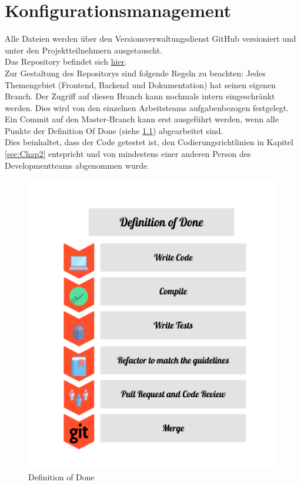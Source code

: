 
\chapter{Konfigurationsmanagement}
Alle Dateien werden über den Versionsverwaltungsdienst GitHub versioniert und unter den Projektteilnehmern ausgetauscht.\\
Das Repository befindet sich \href{https://github.com/LucRome/SWE_Semester4}{hier}.\\

Zur Gestaltung des Repositorys sind folgende Regeln zu beachten:
Jedes Themengebiet (Frontend, Backend und Dokumentation) hat seinen eigenen Branch.
Der Zugriff auf diesen Branch kann nochmals intern eingeschränkt werden. Dies wird von den einzelnen Arbeitsteams aufgabenbezogen festgelegt. \\
Ein Commit auf den Master-Branch kann erst ausgeführt werden, wenn alle Punkte der Definition Of Done (siehe \ref{fib:DOD}) abgearbeitet sind. \\
Dies beinhaltet, dass der Code getestet ist, den Codierungsrichtlinien in Kapitel \ref{sec:Chap2} entspricht und von mindestens einer anderen Person des Developmentteams abgenommen wurde. \\

\begin{figure}[H]
\centering
\includegraphics[height=.8\textwidth]{definition_of_done.png}
\caption{Definition of Done}
\label{fib:DOD}
\end{figure}

